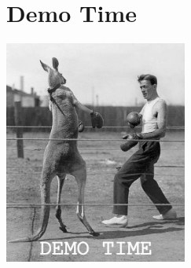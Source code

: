 \documentclass[ucs,9pt]{beamer}
\begin{document}
\section{Demo Time}
\begin{frame}{\insertsection}
    \centering
    \includegraphics[width=6cm]{image.jpg}
\end{frame}
\end{document}
